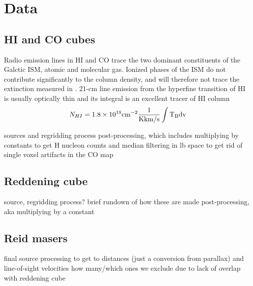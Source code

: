 \section{Data}
\label{sec:data}
\subsection{HI and CO cubes}

Radio emission lines in HI and CO trace the two dominant constituents of the Galctic ISM, atomic and molecular gas. Ionized phases of the ISM do not contribute significantly to the column density, and will therefore not trace the extinction measured in \cite{Green_2015}. 21-cm line emission from the hyperfine transition of HI is usually optically thin and its integral is an excellent tracer of HI column
\begin{equation}
N_{HI} = 1.8 \times 10^{18} \rm cm^{-2} \frac{1}{\rm K km/s} \int T_B dv
\end{equation}


sources and regridding process
post-processing, which includes multiplying by constants to get H nucleon counts and median filtering in lb space to get rid of single voxel artifacts in the CO map

\subsection{Reddening cube}
source, regridding process?
brief rundown of how these are made
post-processing, aka multiplying by a constant

\subsection{Reid masers}
final source
processing to get to distances (just a conversion from parallax) and line-of-sight velocities
how many/which ones we exclude due to lack of overlap with reddening cube